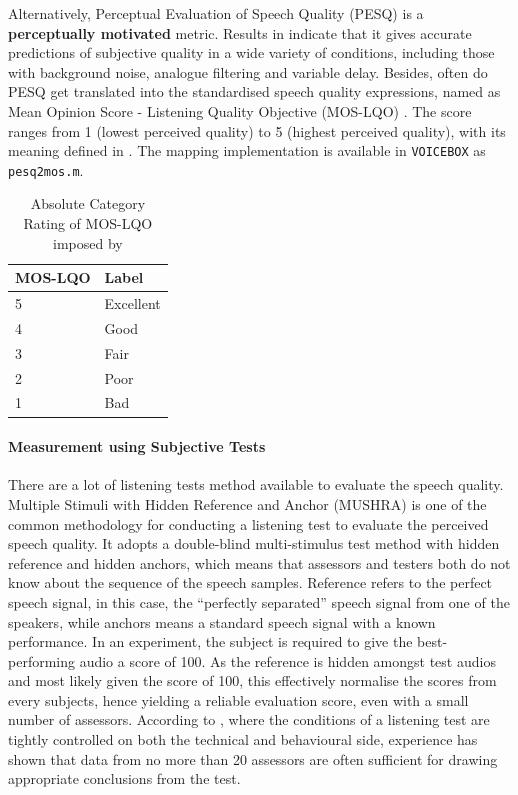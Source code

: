 \documentclass[a4paper,twoside,12pt,hidelinks]{article}
\begin{document}
Alternatively, Perceptual Evaluation of Speech Quality (PESQ) \cite{RixPerceptualCodecs} is a \textbf{perceptually motivated} metric. Results in \cite{RixPerceptualCodecs} indicate that it gives accurate predictions of subjective quality in a wide variety of conditions, including those with background noise, analogue filtering and variable delay. Besides, often do PESQ get translated into the standardised speech quality expressions, named as Mean Opinion Score - Listening Quality Objective (MOS-LQO) \cite{ITU-T2006P.800.1:Terminology,ITU-T2003Rec.MOS-LQO}. The score ranges from 1 (lowest perceived quality) to 5 (highest perceived quality), with its meaning defined in  \cite{ITU-T1996P.800:Quality}. The mapping implementation is available in \texttt{VOICEBOX} \cite{Brookes1997VOICEBOX:MATLAB.} as \texttt{pesq2mos.m}.

\begin{table}[H]
\centering
\begin{tabular}{|l|l|}
\hline
\textbf{MOS-LQO} & \textbf{Label} \\ \hline
5 & Excellent \\ \hline
4 & Good \\ \hline
3 & Fair \\ \hline
2 & Poor \\ \hline
1 & Bad \\ \hline
\end{tabular}
\caption{Absolute Category Rating of MOS-LQO imposed by \cite{ITU-T1996P.800:Quality}}
\label{table:MOS-LQO}
\end{table}

\paragraph{Measurement using Subjective Tests}
\label{sect:MUSHRAreview}
There are a lot of listening tests method available to evaluate the speech quality. Multiple Stimuli with Hidden Reference and Anchor (MUSHRA) \cite{InternationalTelecommunicationUnion2015ITU-RSystems} is one of the common methodology for conducting a listening test to evaluate the perceived speech quality. It adopts a double-blind multi-stimulus test method with hidden reference and hidden anchors, which means that assessors and testers both do not know about the sequence of the speech samples. Reference refers to the perfect speech signal, in this case, the ``perfectly separated'' speech signal from one of the speakers, while anchors means a standard speech signal with a known performance. In an experiment, the subject is required to give the best-performing audio a score of 100. As the reference is hidden amongst test audios  and most likely given the score of 100, this effectively normalise the scores from every subjects, hence yielding a reliable evaluation score, even with a small number of assessors. According to \cite{InternationalTelecommunicationUnion2015ITU-RSystems}, where the conditions of a listening test are tightly controlled on both the technical and behavioural side, experience has shown that data from no more than 20 assessors are often sufficient for drawing appropriate conclusions from the test. 
\end{document}
